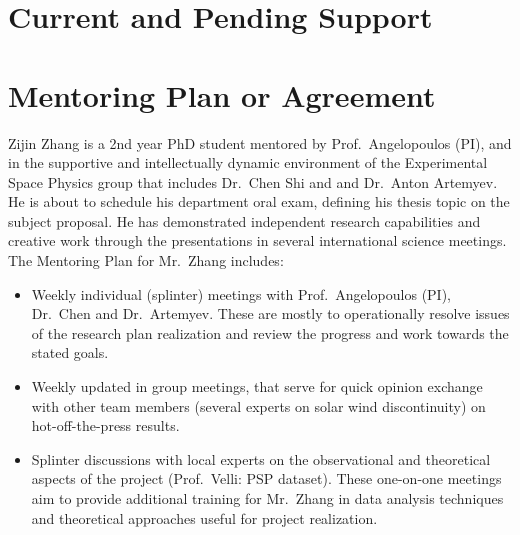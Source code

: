 \documentclass[
  letterpaper,
  DIV=11,
  numbers=noendperiod]{scrartcl}
\providecommand{\tightlist}{%
  \setlength{\itemsep}{0pt}\setlength{\parskip}{0pt}}\usepackage{longtable,booktabs,array}
\begin{document}


\section{Current and Pending Support}\label{current-and-pending-support}






\section{Mentoring Plan or Agreement}\label{mentoring-plan-or-agreement}

Zijin Zhang is a 2nd year PhD student mentored by Prof.~Angelopoulos
(PI), and in the supportive and intellectually dynamic environment of
the Experimental Space Physics group that includes Dr.~Chen Shi and and
Dr.~Anton Artemyev. He is about to schedule his department oral exam,
defining his thesis topic on the subject proposal. He has demonstrated
independent research capabilities and creative work through the
presentations in several international science meetings. The Mentoring
Plan for Mr.~Zhang includes:

\begin{itemize}
\tightlist
\item
  Weekly individual (splinter) meetings with Prof.~Angelopoulos (PI),
  Dr.~Chen and Dr.~Artemyev. These are mostly to operationally resolve
  issues of the research plan realization and review the progress and
  work towards the stated goals.
\item
  Weekly updated in group meetings, that serve for quick opinion
  exchange with other team members (several experts on solar wind
  discontinuity) on hot-off-the-press results.
\item
  Splinter discussions with local experts on the observational and
  theoretical aspects of the project (Prof.~Velli: PSP dataset). These
  one-on-one meetings aim to provide additional training for Mr.~Zhang
  in data analysis techniques and theoretical approaches useful for
  project realization.
\end{itemize}
\end{document}
